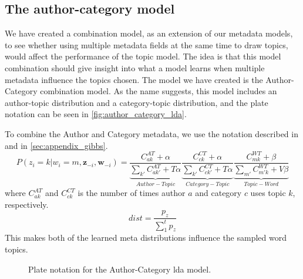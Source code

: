 \subsection{The author-category model}\label{sec:combination}
We have created a combination model, as an extension of our metadata models, to see whether using multiple metadata fields at the same time to draw topics, would affect the performance of the topic model.
The idea is that this model combination should give insight into what a model learns when multiple metadata influence the topics chosen.
The model we have created is the Author-Category combination model.
As the name suggests, this model includes an author-topic distribution and a category-topic distribution, and the plate notation can be seen in \autoref{fig:author_category_lda}.

To combine the Author and Category metadata, we use the notation described in \citet{author_topic_2012} and in \ref{sec:appendix_gibbs}.
\begin{equation}
		P(z_i = k |w_i = m, \boldsymbol{z}_{-i}, \boldsymbol{w}_{-i}) = 
	\underbrace{\frac{C^{AT}_{ak} + \alpha}{\sum_{k'} C^{AT}_{ak'} + T\alpha}}_{Author-Topic}
	\underbrace{\frac{C^{CT}_{ck} + \alpha}{\sum_{k'} C^{CT}_{ck'} + T\alpha}}_{Category-Topic}
	\underbrace{\frac{C^{WT}_{mk} + \beta}{\sum_{m'} C^{WT}_{m'k} + V\beta}}_{Topic-Word}
\end{equation}
where $C^{AT}_{ak}$ and $C^{CT}_{ck}$ is the number of times author $a$ and category $c$ uses topic $k$, respectively.
\begin{equation}
	dist = \frac{p_z}{\sum_{1}^{t} p_z}
\end{equation}
This makes both of the learned meta distributions influence the sampled word topics.

\begin{figure*}[ht]
	\centering
	\resizebox{.3\textwidth}{!}{%
		
	}
	\caption{Plate notation for the Author-Category \gls{lda} model.}
	\label{fig:author_category_lda}
\end{figure*}




